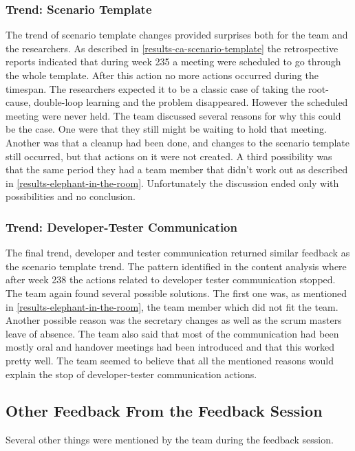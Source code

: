 \subsubsection{Trend: Scenario Template}
The trend of scenario template changes provided surprises both for the team and the researchers. As described in \autoref{results-ca-scenario-template} the retrospective reports indicated that during week 235 a meeting were scheduled to go through the whole template. After this action no more actions occurred during the timespan. The researchers expected it to be a classic case of taking the root-cause, double-loop learning and the problem disappeared. However the scheduled meeting were never held. The team discussed several reasons for why this could be the case. One were that they still might be waiting to hold that meeting. Another was that a cleanup had been done, and changes to the scenario template still occurred, but that actions on it were not created. A third possibility was that the same period they had a team member that didn't work out as described in \autoref{results-elephant-in-the-room}. Unfortunately the discussion ended only with possibilities and no conclusion. 

\subsubsection{Trend: Developer-Tester Communication}
The final trend, developer and tester communication returned similar feedback as the scenario template trend. The pattern identified in the content analysis where after week 238 the actions related to developer tester communication stopped. The team again found several possible solutions. The first one was, as mentioned in \autoref{results-elephant-in-the-room}, the team member which did not fit the team. Another possible reason was the secretary changes as well as the scrum masters leave of absence. The team also said that most of the communication had been mostly oral and handover meetings had been introduced and that this worked pretty well. The team seemed to believe that all the mentioned reasons would explain the stop of developer-tester communication actions. 

\subsection{Other Feedback From the Feedback Session}
Several other things were mentioned by the team during the feedback session. 

